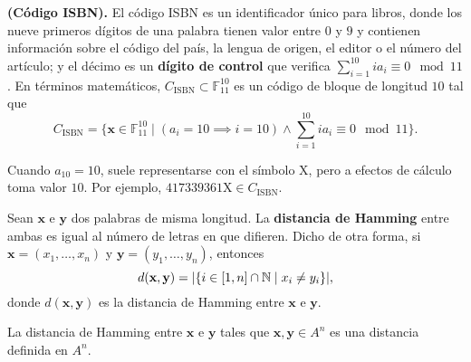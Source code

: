 \begin{example} \textbf{(Código ISBN).}
	El código ISBN es un identificador único para libros, donde los nueve primeros dígitos de una palabra tienen valor entre $0$ y $9$ y contienen información sobre el código del país, la lengua de origen, el editor o el número del artículo; y el décimo es un \textbf{dígito de control} que verifica $\sum_{i=1}^{10} ia_i \equiv 0 \mod 11$. En términos matemáticos, $C_{\textrm{ISBN}}\subset\mathbb{F}_{11}^{10}$ es un código de bloque de longitud $10$ tal que
	\[C_{\textrm{ISBN}} = \{\textbf{x}\in\mathbb{F}_{11}^{10} \mid (a_i = 10 \implies i = 10) \wedge \sum_{i=1}^{10}ia_i \equiv 0 \mod 11\}.\]
	\begin{remark}
		Cuando $a_{10} = 10$, suele representarse con el símbolo $\textrm{X}$, pero a efectos de cálculo toma valor $10$. Por ejemplo, $\textrm{417339361X} \in C_{\textrm{ISBN}}$.
	\end{remark}
\end{example}

\begin{definition}
	Sean $\textbf{x}$ e $\textbf{y}$ dos palabras de misma longitud. La \textbf{distancia de Hamming} entre ambas es igual al número de letras en que difieren. Dicho de otra forma, si $\textbf{x} = (x_1, \hdots, x_n)$ y $\textbf{y} = (y_1, \hdots, y_n)$, entonces
	\[d(\textbf{x}, \textbf{y}) = |\{i\in[1, n]\cap\mathbb{N} \mid x_i \neq y_i\}|,\]
	donde $d(\textbf{x}, \textbf{y})$ es la distancia de Hamming entre $\textbf{x}$ e $\textbf{y}$.
\end{definition}

\begin{theorem}
	La distancia de Hamming entre  $\textbf{x}$ e $\textbf{y}$ tales que $\textbf{x}, \textbf{y} \in A^n$ es una distancia definida en $A^n$.
\end{theorem}

